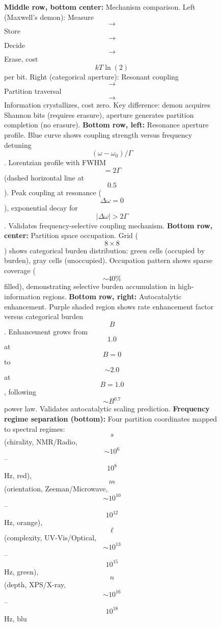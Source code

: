 \begin{figure}[htbp]
{                  \textbf{Middle row, bottom center:} Mechanism comparison. Left (Maxwell's demon): Measure $$\to$$ Store $$\to$$ Decide $$\to$$ Erase, cost $$kT\ln(2)$$ per bit. Right (categorical aperture): Resonant coupling $$\to$$ Partition traversal $$\to$$ Information crystallizes, cost zero. Key difference: demon acquires Shannon bits (requires erasure), aperture generates partition completion (no erasure). 
                  \textbf{Bottom row, left:} Resonance aperture profile. Blue curve shows coupling strength versus frequency detuning $$(\omega - \omega_0)/\Gamma$$. Lorentzian profile with FWHM $$= 2\Gamma$$ (dashed horizontal line at $$0.5$$). Peak coupling at resonance ($$\Delta\omega = 0$$), exponential decay for $$|\Delta\omega| > 2\Gamma$$. Validates frequency-selective coupling mechanism. 
                  \textbf{Bottom row, center:} Partition space occupation. Grid ($$8 \times 8$$) shows categorical burden distribution: green cells (occupied by burden), gray cells (unoccupied). Occupation pattern shows sparse coverage ($$\sim 40\%$$ filled), demonstrating selective burden accumulation in high-information regions. 
                  \textbf{Bottom row, right:} Autocatalytic enhancement. Purple shaded region shows rate enhancement factor versus categorical burden $$B$$. Enhancement grows from $$1.0$$ at $$B=0$$ to $$\sim 2.0$$ at $$B=1.0$$, following $$\sim B^{0.7}$$ power law. Validates autocatalytic scaling prediction. 
                  \textbf{Frequency regime separation (bottom):} Four partition coordinates mapped to spectral regimes: $$s$$ (chirality, NMR/Radio, $$\sim 10^6$$--$$10^8$$ Hz, red), $$m$$ (orientation, Zeeman/Microwave, $$\sim 10^{10}$$--$$10^{12}$$ Hz, orange), $$\ell$$ (complexity, UV-Vis/Optical, $$\sim 10^{13}$$--$$10^{15}$$ Hz, green), $$n$$ (depth, XPS/X-ray, $$\sim 10^{16}$$--$$10^{18}$$ Hz, blu}
                  \label{fig:information_catalysis_validation}
                  \end{figure}
 
